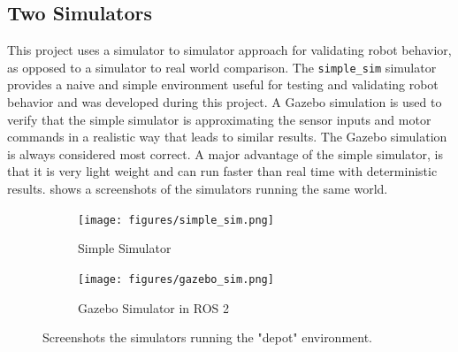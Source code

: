 \subsection{Two Simulators}
This project uses a simulator to simulator approach for validating robot behavior, as opposed to a simulator to real world comparison. The \texttt{simple\_sim} simulator provides a naive and simple environment useful for testing and validating robot behavior and was developed during this project. A Gazebo simulation is used to verify that the simple simulator is approximating the sensor inputs and motor commands in a realistic way that leads to similar results. The Gazebo simulation is always considered most correct. A major advantage of the simple simulator, is that it is very light weight and can run faster than real time with deterministic results. 
 shows a screenshots of the simulators running the same world.

\begin{figure}[h]
    \centering
    \begin{subfigure}[b]{0.45\textwidth}
        \centering
        \texttt{[image: figures/simple\_sim.png]}
        \caption{Simple Simulator}
    \end{subfigure}
    \hfill
    \begin{subfigure}[b]{0.45\textwidth}
        \centering
        \texttt{[image: figures/gazebo\_sim.png]}
        \caption{Gazebo Simulator in ROS 2}
    \end{subfigure}
    \caption{Screenshots the simulators running the "depot" environment.}
      \label{fig:simulators}
\end{figure}
